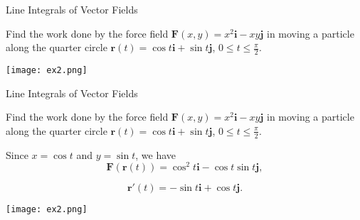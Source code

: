 \documentclass[11pt,english,
handout
]{beamer}
\begin{document}
\begin{frame}[t]{Line Integrals of Vector Fields}
\small

\begin{example}
Find the work done by the force field $\mathbf{F}(x,y)=x^2\mathbf{i}-xy\mathbf{j}$ in moving a particle along the quarter circle $\mathbf{r}(t)=\cos t\mathbf{i}+\sin t\mathbf{j}$, $0\leq t \leq \frac{\pi}{2}$.


\begin{center}
\texttt{[image: ex2.png]}
\end{center}
\end{example}
\end{frame}













\begin{frame}[t]{Line Integrals of Vector Fields}
\small

\begin{example}
Find the work done by the force field $\mathbf{F}(x,y)=x^2\mathbf{i}-xy\mathbf{j}$ in moving a particle along the quarter circle $\mathbf{r}(t)=\cos t\mathbf{i}+\sin t\mathbf{j}$, $0\leq t \leq \frac{\pi}{2}$.

\lspace
\begin{minipage}{0.5\textwidth}
Since $x=\cos t$ and $y=\sin t$, we have 
\[
\mathbf{F}(\mathbf{r}(t))=\cos^2 t\mathbf{i}-\cos t\sin t \mathbf{j},
\]

\[
\mathbf{r}'(t)=-\sin t\mathbf{i}+\cos t\mathbf{j}.
\]
\end{minipage}%
\begin{minipage}{0.5\textwidth}
\centering
\texttt{[image: ex2.png]}
\end{minipage}
\end{example}
\end{frame}
\end{document}

